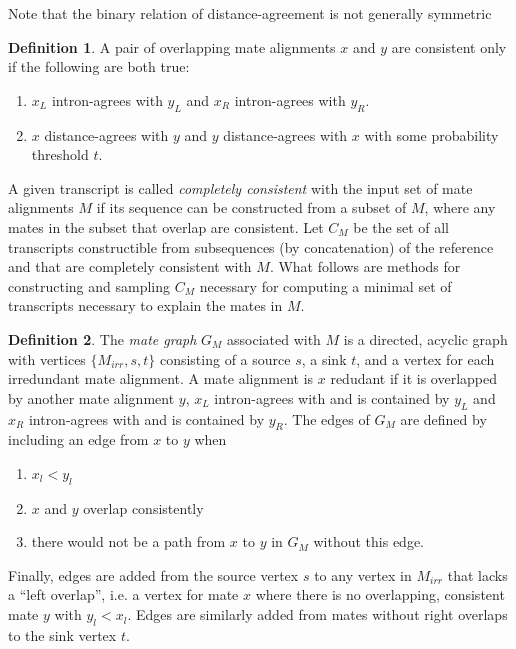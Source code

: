 \documentclass[twocolumn]{homework}
\theoremstyle{definition}
\newtheorem{defn}{Definition}
\begin{document}
Note that the binary relation of distance-agreement is not generally symmetric

\begin{defn}
    A pair of overlapping mate alignments $x$ and $y$ are consistent only if the following are both true:
    \begin{enumerate}
        \item $x_L$ intron-agrees with $y_L$ and $x_R$ 
            intron-agrees with $y_R$.
        \item $x$ distance-agrees with $y$ and $y$ distance-agrees with $x$ with some probability threshold $t$.
    \end{enumerate}
\end{defn}

A given transcript is called \emph{completely consistent} with the input set of mate alignments $M$ if its sequence can be constructed from a subset of $M$, where any mates in the subset that overlap are consistent.  Let $C_M$ be the set of all transcripts constructible from subsequences (by concatenation) of the reference and that are completely consistent with $M$.  What follows are methods for constructing and sampling $C_M$ necessary for computing a minimal set of transcripts necessary to explain the mates in $M$.

\begin{defn}
    The \emph{mate graph} $G_M$ associated with $M$ is a directed, acyclic graph with vertices $\{M_{irr}, s, t\}$ consisting of a source $s$, a sink $t$, and a vertex for each irredundant mate alignment.  A mate alignment is $x$ redudant if it is overlapped by another mate alignment $y$, $x_L$ intron-agrees with and is contained by $y_L$ and $x_R$ intron-agrees with and is contained by $y_R$. The edges of $G_M$ are defined by including an edge from $x$ to $y$ when 
    \begin{enumerate}
        \item $x_l < y_l$
        \item $x$ and $y$ overlap consistently
        \item there would not be a path from $x$ to $y$ in $G_M$ without this edge.
    \end{enumerate}
    Finally, edges are added from the source vertex $s$ to any vertex in $M_{irr}$ that lacks a ``left overlap'', i.e. a vertex for mate $x$ where there is no overlapping, consistent mate $y$ with $y_l < x_l$.  Edges are similarly added from mates without right overlaps to the sink vertex $t$.
\end{defn}
\end{document}

